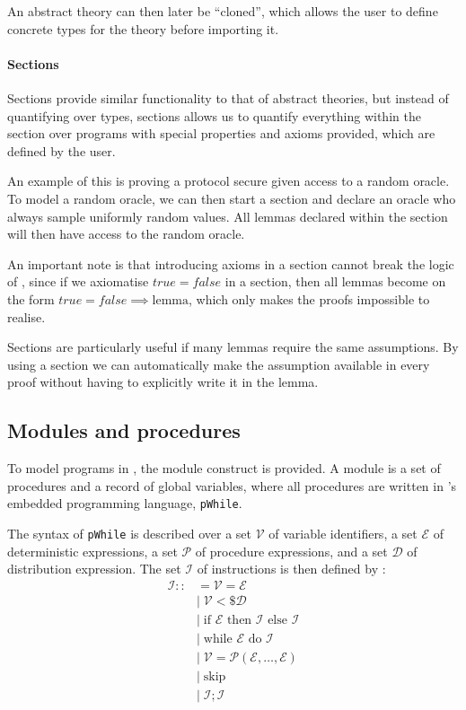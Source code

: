 An abstract theory can then later be ``cloned'', which allows the user to define
concrete types for the theory before importing it.

\paragraph{Sections}
Sections provide similar functionality to that of abstract theories, but instead of quantifying over
types, sections allows us to quantify everything within the section over programs
with special properties and axioms provided, which are defined by the user.

An example of this is proving a protocol secure given access to a
random oracle.
To model a random oracle, we can then start a section and declare an oracle who
always sample uniformly random values.
All lemmas declared within the section will then have access to the random
oracle.

An important note is that introducing axioms in a section cannot break the logic
of \easycrypt, since if we axiomatise $true = false$ in a section, then all
lemmas become on the form $true = false \implies \text{lemma}$, which only
makes the proofs impossible to realise.

Sections are particularly useful if many lemmas require the same assumptions. By
using a section we can automatically make the assumption available in every
proof without having to explicitly write it in the lemma.

\subsection{Modules and procedures}
\label{sec:ec_modules}
To model programs in \easycrypt, the module construct is provided.
A module is a set of procedures and a record of global variables, where all
procedures are written in \easycrypt's embedded programming language, \texttt{pWhile}.

The syntax of \texttt{pWhile} is described over a set $\mathcal{V}$ of variable
identifiers, a set $\mathcal{E}$ of deterministic expressions, a set
$\mathcal{P}$ of procedure expressions, and a set $\mathcal{D}$ of distribution
expression.
The set $\mathcal{I}$ of instructions is then defined
by \cite{zkcrypt}:
\begin{align*}
  \mathcal{I} ::&= \mathcal{V} = \mathcal{E} \\
              &|\; \mathcal{V} <\$ \mathcal{D} \\
              &|\; \text{if } \mathcal{E} \text{ then } \mathcal{I} \text{ else } \mathcal{I} \\
              &|\; \text{while } \mathcal{E} \text{ do } \mathcal{I} \\
              &|\; \mathcal{V} = \mathcal{P}(\mathcal{E}, \dots, \mathcal{E}) \\
              &|\; \text{skip} \\
              &|\; \mathcal{I}; \mathcal{I}
\end{align*}

